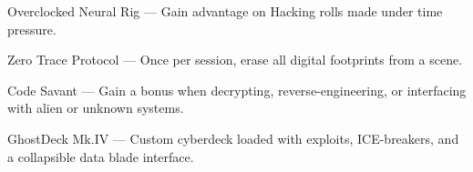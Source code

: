 \begin{WyrdCharacterSheet}
\begin{WyrdStatsBlock}[profile=img/characters/rhett_vex]
        \begin{TraitsBox}
            \item[Overclocked Neural Rig] — Gain advantage on Hacking rolls made under time pressure.
            \item[Zero Trace Protocol] — Once per session, erase all digital footprints from a scene.
            \item[Code Savant] — Gain a bonus when decrypting, reverse-engineering, or interfacing with alien or unknown systems.
        \end{TraitsBox}
  
        \begin{GearBox}
            \item[GhostDeck Mk.IV] — Custom cyberdeck loaded with exploits, ICE-breakers, and a collapsible data blade interface.
        \end{GearBox}

        \DamageBox
    \end{WyrdStatsBlock}
\end{WyrdCharacterSheet}



